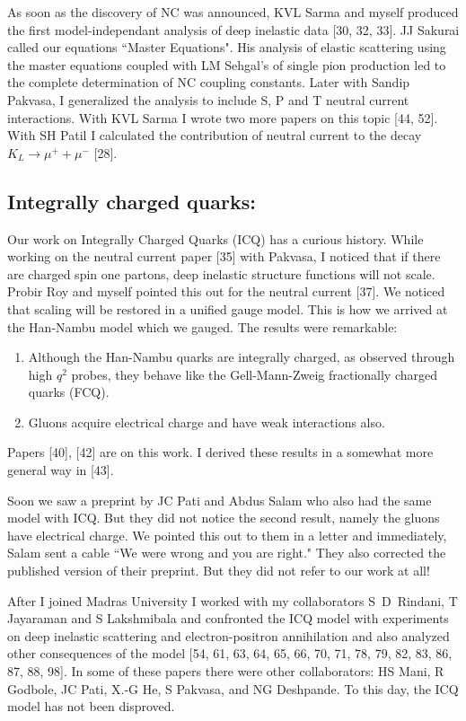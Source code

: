 As soon as the discovery of NC was announced, KVL Sarma and myself 
produced the first model-independant analysis of de\-ep inelastic data 
[30, 32, 33]. JJ Sakurai called our equations ``Master Equations". His 
analysis of elastic scattering using the master equations coupled with 
LM Sehgal's of single pion production led to the complete determination 
of NC coupling constants. Later with Sandip Pakvasa, I generalized the 
analysis to include S, P and T neutral current interactions. With KVL 
Sarma I wrote two more papers on this topic [44, 52]. With SH Patil I 
calculated the contribution of neutral current to the decay $K_L \rightarrow
\mu^+ + \mu^-$ [28].
\vspace{-\topsep}
\subsection*{Integrally charged quarks:}

Our work on Integrally Charged Quarks (ICQ) has a curious history. While 
working on the neutral current paper [35] with Pakvasa, I noticed that 
if there are charged spin one partons, deep inelastic structure 
functions will not scale. Probir Roy and myself pointed this out for the 
neutral current [37]. We noticed that scaling will be restored in a 
unified gauge model. This is how we arrived at the Han-Nambu model which 
we gauged. The results were remarkable:

\begin{enumerate}
\itemsep=0pt
\item Although the Han-Nambu quarks are integrally charged, as observed 
through high $q^2$ probes, they behave like the Gell-Mann-Zweig 
fractionally charged quarks (FCQ).
\item Gluons acquire electrical charge and have weak interactions also.
\end{enumerate}

Papers [40], [42] are on this work. I derived these results in a somewhat 
more general way in [43].

Soon we saw a preprint by JC Pati and Abdus Salam who also had the same 
model with ICQ. But they did not notice the second result, namely the 
gluons have electrical charge. We pointed this out to them in a letter 
and immediately, Salam sent a cable ``We were wrong and you are right." 
They also corrected the published version of their preprint. But they 
did not refer to our work at all!

After I joined Madras University I worked with my collabora\-tors 
S~D~Rindani, T Jayaraman and S Lakshmibala and confronted the\- ICQ model with 
experiments on deep inelastic scatte\-ring and electron-positron 
annihilation and also analyzed other consequences of the model 
[54, 61, 63, 64, 65, 66, 70, 71, 78, 79, 82, 83, 86, 87, 88, 98]. In some of these 
papers there were other collabo\-rators: HS Mani, R Godbole, JC Pati, X.-G 
He, S Pakvasa, and NG Deshpande. To this day, the ICQ model has not been 
disproved.

